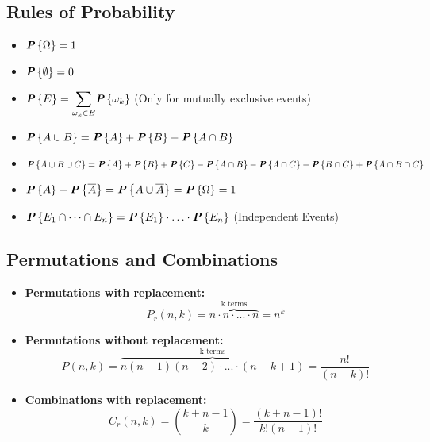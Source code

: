 \begin{multicols}{2}
\subsection{Rules of Probability}

\begin{itemize}
    \item $\textbf{\textit{P}}\left\{\Omega\right\} = 1$
    \item $\textbf{\textit{P}}\left\{\emptyset\right\} = 0$
    \item $\prob{E} = \dsum_{\omega_k \in E} \prob{\omega_k}$ (Only for mutually exclusive events)
    \item $\textbf{\textit{P}}\left\{A \cup B\right\} = \textbf{\textit{P}}\left\{A\right\} + \textbf{\textit{P}}\left\{B\right\} - \textbf{\textit{P}}\left\{A \cap B\right\}$
    \item $\textbf{\textit{P}}\left\{A \cup B \cup C\right\} = \textbf{\textit{P}}\left\{A\right\} + \textbf{\textit{P}}\left\{B\right\} + \textbf{\textit{P}}\left\{C\right\} - \textbf{\textit{P}}\left\{A \cap B\right\} - \textbf{\textit{P}}\left\{A \cap C\right\} - \textbf{\textit{P}}\left\{B \cap C\right\} + \textbf{\textit{P}}\left\{A \cap B \cap C\right\}$
    \item $\textbf{\textit{P}}\left\{A\right\} + \textbf{\textit{P}}\left\{\overline{A}\right\} = \textbf{\textit{P}}\left\{A \cup \overline{A}\right\} = \textbf{\textit{P}}\left\{\Omega\right\} = 1$
    \item $\textbf{\textit{P}}\left\{E_1 \cap \cdots \cap E_n\right\} = \textbf{\textit{P}}\left\{E_1\right\} \cdot \ldots \cdot \textbf{\textit{P}}\left\{E_n\right\}$ (Independent Events)
\end{itemize}


\subsection{Permutations and Combinations}

\begin{itemize}
    \item \textbf{Permutations with replacement:}
        \begin{equation*}
            P_r(n,k) = \overbrace{n \cdot n \cdot ... \cdot n}^{\text{k terms}} = n^k
        \end{equation*}
    
    \item \textbf{Permutations without replacement:}
        \begin{equation*}
            P(n,k) = \overbrace{n(n-1)(n-2) \cdot ... \cdot (n - k + 1)}^{\text{k terms}} = \dfrac{n!}{(n - k)!}
        \end{equation*}
    
    \item \textbf{Combinations with replacement:}
        \begin{equation*}
            C_r(n,k) = \binom{k + n - 1}{k} = \dfrac{(k + n - 1)!}{k! (n - 1)!}
        \end{equation*}
    

\end{itemize}
\end{multicols}
